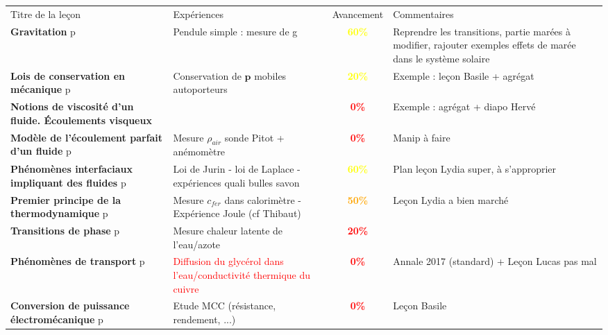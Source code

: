 \begin{changemargin}{-1.5cm}{-0cm}

\begin{center}
\begin{tabularx}{\paperwidth-2cm}{| X | X | c | X |}
  \hline
  \rowcolor{gray!20}\multicolumn{4}{c}{Avancement préparation oraux Leçons Physique} \\
  \hline 
  Titre de la leçon & Expériences & Avancement & Commentaires \\
  \hline
\textbf{Gravitation} p\pageref{LP_Gravitation}  & Pendule simple : mesure de g & \textcolor{yellow}{\textbf{60\%}}  & Reprendre les transitions, partie marées à modifier, rajouter exemples effets de marée dans le système solaire   \\
  \hline 
  \hline
     \textbf{Lois de conservation en mécanique} p\pageref{LP_LoisConservation} & Conservation de $\mathbf{p}$ mobiles autoporteurs  &  \textcolor{yellow}{\textbf{20\%}}  & Exemple : leçon Basile + agrégat \\
  \hline 
    \textbf{Notions de viscosité d'un fluide. \'{E}coulements visqueux} &  & \textcolor{red}{\textbf{0\%}} &  Exemple : agrégat + diapo Hervé   \\
  \hline 
  \textbf{Modèle de l'écoulement parfait d'un fluide} p\pageref{LP_EcoulementParfait} & Mesure $\rho_{air}$ sonde Pitot + anémomètre & \textcolor{red}{\textbf{0\%}} & Manip à faire \\
  \hline
  \textbf{Phénomènes interfaciaux impliquant des fluides} p\pageref{LP_PhenomenesInterfaciaux} & Loi de Jurin - loi de Laplace - expériences quali bulles savon & \textcolor{yellow}{\textbf{60\%}} & Plan leçon Lydia super, à s'approprier\\
  \hline 
  \hline
  \textbf{Premier principe de la thermodynamique} p\pageref{LP_PremierPrincipe} & Mesure $c_{fer}$ dans calorimètre - Expérience Joule (cf Thibaut) & \textcolor{orange}{\textbf{50\%}} & Leçon Lydia a bien marché \\
  \hline 
  \textbf{Transitions de phase} p\pageref{LP_TransitionPhase} & Mesure chaleur latente de l'eau/azote & \textcolor{red}{\textbf{20\%}} & \\
  \hline 
  \textbf{Phénomènes de transport} p\pageref{LP_Transport} & \textcolor{red}{Diffusion du glycérol dans l'eau/conductivité thermique du cuivre}& \textcolor{red}{\textbf{0\%}} & Annale 2017 (standard) + Leçon Lucas pas mal\\
  \hline 
  \hline
  \textbf{Conversion de puissance électromécanique} p\pageref{LP_ConversionPuissance} & Etude MCC (résistance, rendement, ...) & \textcolor{red}{\textbf{0\%}} & Leçon Basile\\

\end{tabularx}
\end{center}
\end{changemargin}
